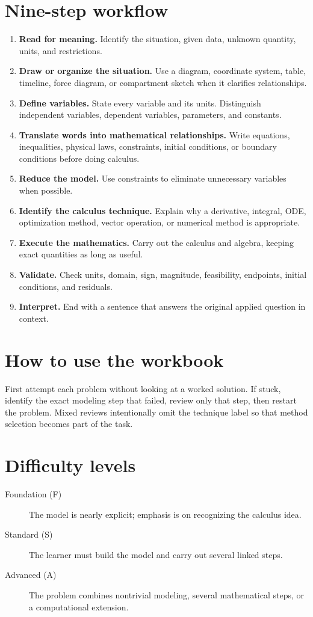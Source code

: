 \documentclass[11pt]{book}
\begin{document}
\section{Nine-step workflow}
\begin{enumerate}
\item \textbf{Read for meaning.} Identify the situation, given data, unknown quantity, units, and restrictions.
\item \textbf{Draw or organize the situation.} Use a diagram, coordinate system, table, timeline, force diagram, or compartment sketch when it clarifies relationships.
\item \textbf{Define variables.} State every variable and its units. Distinguish independent variables, dependent variables, parameters, and constants.
\item \textbf{Translate words into mathematical relationships.} Write equations, inequalities, physical laws, constraints, initial conditions, or boundary conditions before doing calculus.
\item \textbf{Reduce the model.} Use constraints to eliminate unnecessary variables when possible.
\item \textbf{Identify the calculus technique.} Explain why a derivative, integral, ODE, optimization method, vector operation, or numerical method is appropriate.
\item \textbf{Execute the mathematics.} Carry out the calculus and algebra, keeping exact quantities as long as useful.
\item \textbf{Validate.} Check units, domain, sign, magnitude, feasibility, endpoints, initial conditions, and residuals.
\item \textbf{Interpret.} End with a sentence that answers the original applied question in context.
\end{enumerate}
\section{How to use the workbook}
First attempt each problem without looking at a worked solution. If stuck, identify the exact modeling step that failed, review only that step, then restart the problem. Mixed reviews intentionally omit the technique label so that method selection becomes part of the task.
\section{Difficulty levels}
\begin{description}
\item[Foundation (F)] The model is nearly explicit; emphasis is on recognizing the calculus idea.
\item[Standard (S)] The learner must build the model and carry out several linked steps.
\item[Advanced (A)] The problem combines nontrivial modeling, several mathematical steps, or a computational extension.
\end{description}
\end{document}
